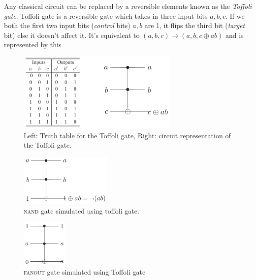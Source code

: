 Any classical circuit can be replaced by a reversible elements known as the \textit{Toffoli gate}. Toffoli gate is a reversible gate which takes in three input bits $a,b,c$. If we both the first two input  bits (\textit{control} bits) $a,b$ are 1, it flips the third bit (\textit{target} bit) else it doesn't affect it. It's equivalent to $(a,b,c)\longrightarrow(a,b,c\oplus ab)$ and is represented by this
\begin{figure}[H]
    \centering
    \includegraphics[width=0.7\textwidth]{images/toffoli.png}
    \caption{Left: Truth table for the Toffoli gate, Right: circuit representation of the Toffoli gate.}
    \label{fig:toffoli}
\end{figure}
\begin{figure}[H]
    \centering
    \includegraphics[width=0.4\textwidth]{images/toffoli_nand.png}
    \caption{\textsc{nand} gate simulated using toffoli gate.}
    \label{fig:toffoli-nand}
\end{figure}
\begin{figure}[H]
    \centering
    \includegraphics[width=0.2\textwidth]{images/toffoli_fanout.png}
    \caption{\textsc{fanout} gate simulated using Toffoli gate}
    \label{fig:toffoli-gate}
\end{figure}
